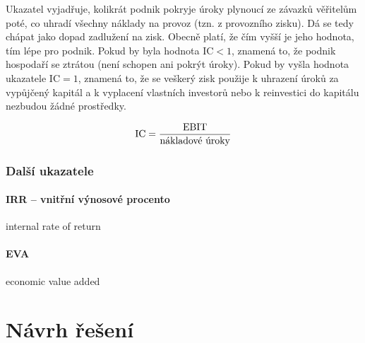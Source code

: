 Ukazatel vyjadřuje, kolikrát podnik pokryje úroky plynoucí ze závazků věřitelům poté, co uhradí všechny náklady na provoz (tzn. z provozního zisku). Dá se tedy chápat jako dopad zadlužení na zisk. Obecně platí, že čím vyšší je jeho hodnota, tím lépe pro podnik. Pokud by byla hodnota IC$<1$, znamená to, že podnik hospodaří se ztrátou (není schopen ani pokrýt úroky). Pokud by vyšla hodnota ukazatele IC$=1$, znamená to, že se veškerý zisk použije k uhrazení úroků za vypůjčený kapitál a k vyplacení vlastních investorů nebo k reinvestici do kapitálu nezbudou žádné prostředky.

$$\text{IC} = \dfrac{\text{EBIT}}{\text{nákladové úroky}}$$








\subsection{Další ukazatele}

\subsubsection{IRR -- vnitřní výnosové procento}
internal rate of return

\subsubsection{EVA}
economic value added







































\chapter{Návrh řešení}



